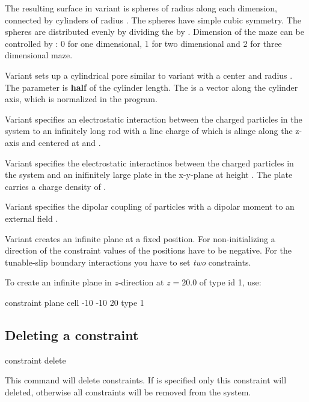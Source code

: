 The resulting surface in variant  is 
spheres of radius  along each dimension, connected by
cylinders of radius . The spheres have simple cubic
symmetry. The spheres are distributed evenly by dividing the
 by .  Dimension of the maze can be controlled by
: 0 for one dimensional, 1 for two dimensional and 2 for three
dimensional maze.

Variant  sets up a cylindrical pore similar to variant
 with a center    and radius
. The  parameter is \textbf{half} of the cylinder
length. The  is a vector along the cylinder axis, which is
normalized in the program.

Variant  specifies an electrostatic interaction between the
charged particles in the system to an infinitely long rod with a line
charge of  which is alinge along the z-axis and centered
at  and .

Variant  specifies the electrostatic interactinos between
the charged particles in the system and an inifinitely large plate in
the x-y-plane at height . The plate carries a charge density of
.
  
Variant  specifies the dipolar coupling of particles with a
dipolar moment to an external field   .

Variant  creates an infinite plane at a fixed position. For
non-initializing a direction of the constraint values of the positions
have to be negative. For the tunable-slip boundary interactions you
have to set \emph{two} constraints.

To create an infinite plane in $z$-direction at $z=20.0$ of type id 1,
use:
\begin{code}
  constraint plane cell -10 -10 20 type 1
\end{code}

\subsection{Deleting a constraint}
\begin{essyntax}
  constraint delete  
\end{essyntax}

This command will delete constraints. If  is specified only this
constraint will deleted, otherwise all constraints will be removed from the
system. 

